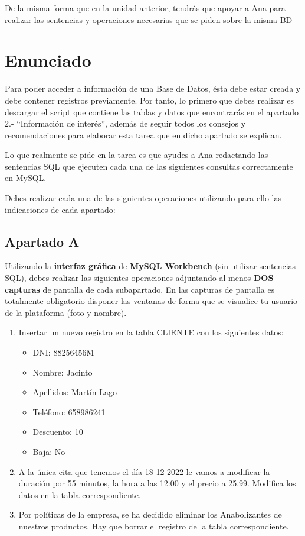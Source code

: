 De la misma forma que en la unidad anterior, tendrás que apoyar a Ana para realizar las sentencias y operaciones necesarias que se piden sobre la misma BD

\section{Enunciado}
Para poder acceder a información de una Base de Datos, ésta debe estar creada y debe contener registros previamente. Por tanto, lo primero que debes realizar es descargar el script que contiene las tablas y datos que encontrarás en el apartado 2.- ``Información de interés'', además de seguir todos los consejos y recomendaciones para elaborar esta tarea que en dicho apartado se explican.

Lo que realmente se pide en la tarea es que ayudes a Ana redactando las sentencias SQL que ejecuten cada una de las siguientes consultas correctamente en MySQL.

Debes realizar cada una de las siguientes operaciones utilizando para ello las indicaciones de cada apartado:

\subsection{Apartado A}
Utilizando la \textbf{interfaz gráfica} de \textbf{MySQL Workbench} (sin utilizar sentencias SQL), debes realizar las siguientes operaciones adjuntando al menos \textbf{DOS capturas} de pantalla de cada subapartado. En las capturas de pantalla es totalmente obligatorio disponer las ventanas de forma que se visualice tu usuario de la plataforma (foto y nombre).

\begin{enumerate}
    \item  Insertar un nuevo registro en la tabla CLIENTE con los siguientes datos:

    \begin{itemize}
        \item DNI: 88256456M
        \item Nombre: Jacinto
        \item Apellidos: Martín Lago
        \item Teléfono: 658986241
        \item Descuento: 10
        \item Baja: No
    \end{itemize}

    \item A la única cita que tenemos el día 18-12-2022 le vamos a modificar la duración por 55 minutos, la hora a las 12:00 y el precio a 25.99. Modifica los datos en la tabla correspondiente.

    \item Por políticas de la empresa, se ha decidido eliminar los Anabolizantes de nuestros productos. Hay que borrar el registro de la tabla correspondiente.
\end{enumerate}

